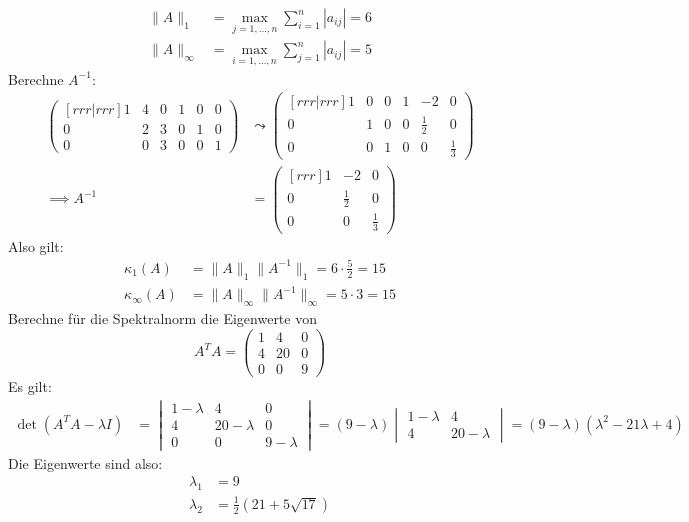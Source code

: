 \documentclass[a4paper]{scrartcl}
\begin{document}
\begin{aufgabe}
	\begin{align*}
		\|A\|_1 &= \max_{j=1,\dots,n}\sum_{i=1}^n|a_{ij}| = 6\\
  \|A\|_\infty &= \max_{i=1,\dots,n}\sum_{j=1}^n|a_{ij}| = 5
	\end{align*}
	Berechne $A^{-1}$:
	\begin{align*}
		\begin{pmatrix}[rrr|rrr]1&4&0&1&0&0\\0&2&3&0&1&0\\0&0&3&0&0&1\end{pmatrix}
		&\leadsto \begin{pmatrix}[rrr|rrr]1&0&0&1&-2&0\\0&1&0&0&\frac 12&0\\0&0&1&0&0&\frac 13\end{pmatrix}\\
		\implies A^{-1} &= \begin{pmatrix}[rrr]1&-2&0\\0&\frac 12&0\\0&0&\frac 13\end{pmatrix}
	\end{align*}
	Also gilt:
	\begin{align*}
		\kappa_1(A)&=\|A\|_1\|A^{-1}\|_1=6\cdot \frac 52=15\\
   \kappa_\infty(A)&=\|A\|_\infty\|A^{-1}\|_\infty=5\cdot 3=15
	\end{align*}
	Berechne für die Spektralnorm die Eigenwerte von
	\[
		A^TA=\begin{pmatrix}1&4&0\\4&20&0\\0&0&9\end{pmatrix}
	\]
	Es gilt:
	\begin{align*}
		\det(A^TA-\lambda I)&=\begin{vmatrix}1-\lambda&4&0\\4&20-\lambda&0\\0&0&9-\lambda\end{vmatrix}
		=(9-\lambda)\begin{vmatrix}1-\lambda&4\\4&20-\lambda\end{vmatrix}
		=(9-\lambda)(\lambda^2-21\lambda+4)
	\end{align*}
	Die Eigenwerte sind also:
	\begin{align*}
		\lambda_1&=9\\
		\lambda_2&=\frac 12(21+5\sqrt{17})\\

\end{align*}
\end{aufgabe}
\end{document}
